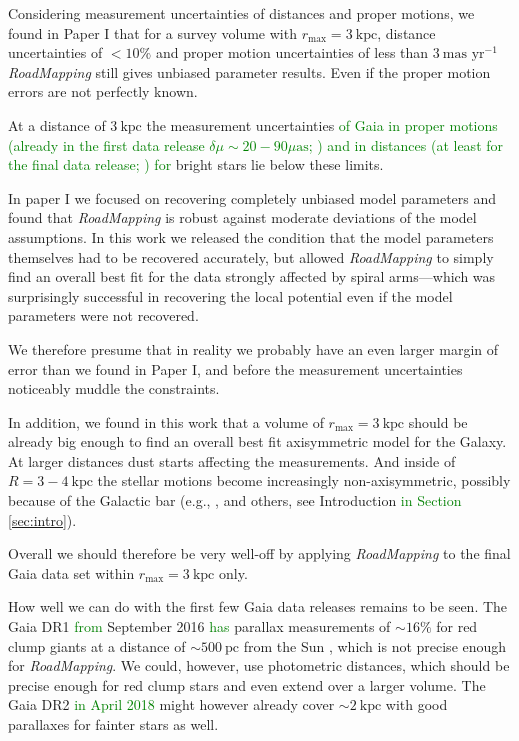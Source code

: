 \documentclass[iop,revtex4,numberedappendix,appendixfloats]{emulateapj}
\newcommand{\RM}{{\sl RoadMapping}}
\newcommand{\NEW}[1]{\textcolor{Green}{#1}}
\newcommand{\OLD}[1]{}
\begin{document}
Considering measurement uncertainties of distances and proper motions, we found in Paper I that for a survey volume with $r_\text{max} = 3~\text{kpc}$, distance uncertainties of $<10\%$ and proper motion uncertainties of less than $3~\text{mas yr}^{-1}$ \RM{} still gives unbiased parameter results. Even if the proper motion errors are not perfectly known. 

At a distance of $3~\text{kpc}$ the measurement uncertainties \NEW{of Gaia in proper motions (already in the first data release $\delta \mu \sim 20-90 \mu\text{as}$; \citealt{2014A&A...571A..85M,2015A&A...574A.115M}) and in distances (at least for the final data release; \citealt{2014EAS....67...23D}) for}\OLD{ of} bright stars \OLD{in (at least the final data release of) Gaia} lie \OLD{even} below these limits. 

In paper I we focused on recovering completely unbiased model parameters and found that \RM{} is robust against moderate deviations of the model assumptions. In this work we released the condition that the model parameters themselves had to be recovered accurately, but allowed \RM{} to simply find an overall best fit for the data strongly affected by spiral arms---which was surprisingly successful in recovering the local potential even if the model parameters were not recovered. 

We therefore presume that in reality we probably have an even larger margin of error than we found in Paper I, and before the measurement uncertainties noticeably muddle the constraints. \OLD{Also, Gaia uncertainties are already below our formal error anyway.}

In addition, we found in this work that a volume of $r_\text{max} = 3~\text{kpc}$ should be already big enough to find an overall best fit axisymmetric model for the Galaxy. At larger distances dust starts affecting the measurements. And inside of $R=3-4~\text{kpc}$ the stellar motions become increasingly non-axisymmetric, possibly because  of the Galactic bar (e.g., \citealt{2014ApJ...783..130R,2015ApJ...800...83B}, and others, see Introduction \NEW{in Section} \ref{sec:intro}).

Overall we should therefore be very well-off by applying \RM{} to the final Gaia data set within $r_\text{max}=3~\text{kpc}$ only.

How well we can do with the first few Gaia data releases remains to be seen. The Gaia DR1 \OLD{in}\NEW{from} September 2016 \OLD{will have}\NEW{has} parallax measurements of $\sim16\%$ for red clump giants at a distance of $\sim 500~\text{pc}$ from the Sun \citep{2014EAS....67...23D,2015A&A...574A.115M}, which is not precise enough for \RM{}. We could, however, use photometric distances, which should be precise enough for red clump stars and even extend over a larger volume. The Gaia DR2 \OLD{at the end of 2017}\NEW{in April 2018} might however already cover $\sim 2~\text{kpc}$ with good parallaxes for fainter stars as well.
\end{document}
